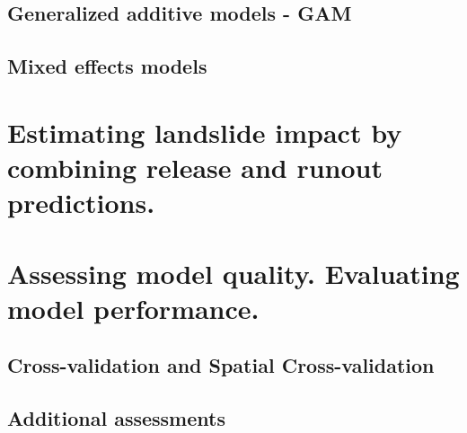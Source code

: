 \subsection{Generalized additive models - GAM}\label{GAM}

{\textcolor{red}{ \lipsum[1]}}

\subsection{Mixed effects models}\label{Mixed-effects}
{\textcolor{red}{ \lipsum[1]}}


\section{Estimating landslide impact by combining release and runout predictions.} \label{r.randomwalk}

{\textcolor{red}{ \lipsum[1]}}   

    
\section{Assessing model quality. Evaluating model performance.}\label{methods_valid}
{\textcolor{red}{ \lipsum[1]}}


\subsection{Cross-validation and Spatial Cross-validation} \label{methods_valid_cross}  
{\textcolor{red}{\lipsum[1]}}

      
\subsection{Additional assessments}\label{Additional assessments}
{\textcolor{red}{ \lipsum[1]}}	
